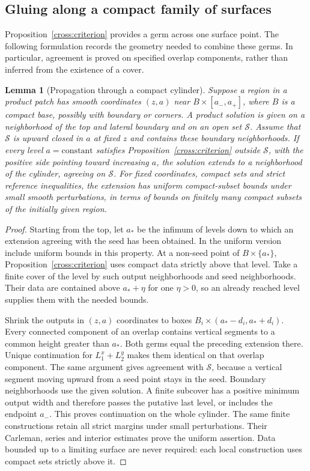 \documentclass[11pt]{article}
\newtheorem{lemma}[theorem]{Lemma}
\theoremstyle{definition}
\theoremstyle{remark}
\numberwithin{equation}{section}
\begin{document}
\subsection{Gluing along a compact family of surfaces}

Proposition~\ref{cross:criterion} provides a germ across one surface
point.  The following formulation records the geometry needed to
combine these germs.  In particular, agreement is proved on specified
overlap components, rather than inferred from the existence of a cover.

\begin{lemma}[Propagation through a compact cylinder]
\label{cross:propagation}
Suppose a region in a product patch has smooth coordinates $(z,a)$
near $B\times[a_-,a_+]$, where $B$ is a compact base, possibly with
boundary or corners.  A product solution is given on a neighborhood
of the top and lateral boundary and on an open set $\mathcal S$.
Assume that $\mathcal S$ is upward closed in $a$ at fixed $z$ and
contains these boundary neighborhoods.  If every level $a=\text{constant}$
satisfies Proposition~\ref{cross:criterion} outside $\mathcal S$, with
the positive side pointing toward increasing $a$, the solution extends
to a neighborhood of the cylinder, agreeing on $\mathcal S$.
For fixed coordinates, compact sets and strict reference inequalities,
the extension has uniform compact-subset bounds under small smooth
perturbations, in terms of bounds on finitely many compact subsets of
the initially given region.
\end{lemma}

\begin{proof}
Starting from the top, let $a_*$ be the infimum of levels down to which
an extension agreeing with the seed has been obtained.  In the uniform
version include uniform bounds in this property.  At a non-seed point
of $B\times\{a_*\}$, Proposition~\ref{cross:criterion} uses compact
data strictly above that level.  Take a finite cover of the level by
such output neighborhoods and seed neighborhoods.  Their data are
contained above $a_*+\eta$ for one $\eta>0$, so an already reached
level supplies them with the needed bounds.

Shrink the outputs in $(z,a)$ coordinates to boxes
$B_i\times(a_*-d_i,a_*+d_i)$.
Every connected component of an overlap contains vertical segments
to a common height greater than $a_*$.  Both germs equal the preceding
extension there.  Unique continuation for $L_1^x+L_2^y$ makes them
identical on that overlap component.  The same argument gives agreement
with $\mathcal S$, because a vertical segment moving upward from a
seed point stays in the seed.  Boundary neighborhoods use the given
solution.  A finite subcover has a positive minimum output width and
therefore passes the putative last level, or includes the endpoint
$a_-$.  This proves continuation on the whole cylinder.
The same finite constructions retain all strict margins under small
perturbations.  Their Carleman, series and interior estimates prove
the uniform assertion.  Data bounded up to a limiting surface are
never required: each local construction uses compact sets strictly
above it.
\end{proof}
\end{document}
